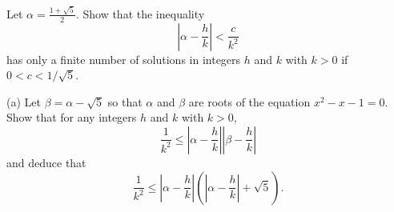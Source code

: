 Let $\alpha = \frac{1 + \sqrt{5}}{2}$. Show that the inequality
$$\left| \alpha - \frac{h}{k} \right| < \frac{c}{k^2}$$
has only a finite number of solutions in integers $h$ and $k$ with $k > 0$ if $0 < c < 1/\sqrt{5}$.

(a) Let $\beta = \alpha - \sqrt{5}$ so that $\alpha$ and $\beta$ are roots of the equation $x^2 - x - 1 = 0$. Show that for any integers $h$ and $k$ with $k > 0$,
$$\frac{1}{k^2} \leq \left| \alpha - \frac{h}{k} \right| \left| \beta - \frac{h}{k} \right|$$
and deduce that
$$\frac{1}{k^2} \leq \left| \alpha - \frac{h}{k} \right| \left( \left| \alpha - \frac{h}{k} \right| + \sqrt{5} \right).$$
